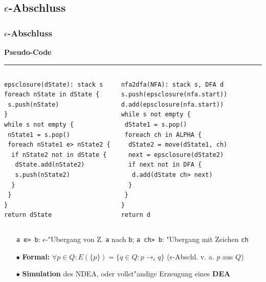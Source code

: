 \documentclass[ignorenonframetext]{beamer}
\begin{document}
\subsection{$\epsilon$-Abschluss}
\begin{frame}[fragile]
    \frametitle{$\epsilon$-Abschluss}
    
        \textbf{Pseudo-Code} 
        \hrule
        \begin{columns}
        \column{4.5cm}
\begin{lstlisting}
epsclosure(dState): stack s
foreach nState in dState {
 s.push(nState)
}
while s not empty { 
 nState1 = s.pop()
 foreach nState1 e> nState2 {
  if nState2 not in dState {
   dState.add(nState2)
   s.push(nState2)
  }
 }
}
return dState
\end{lstlisting}

        \column{4.3cm}
\begin{lstlisting}
nfa2dfa(NFA): stack s, DFA d
s.push(epsclosure(nfa.start))
d.add(epsclosure(nfa.start))
while s not empty {
 dState1 = s.pop()
 foreach ch in ALPHA {
  dState2 = move(dState1, ch)
  next = epsclosure(dState2)
  if next not in DFA {
   d.add(dState ch> next)
  }
 }
}
return d
\end{lstlisting}

        \end{columns}
\begin{itemize}
    \item[]  \footnotesize \texttt{a e> b}: $\epsilon$-"Ubergang von Z. \texttt{a} nach \texttt{b}; \texttt{a ch> b}: "Ubergang mit Zeichen \texttt{ch}
    \item[$\bullet$] \textbf{Formal:} $\forall p \in Q : E(\{p\}) = \{ q \in Q : p \rightarrow_\epsilon q \}$ ($\epsilon$-Abschl. v. a. $p$ aus $Q$)
    \item[$\bullet$] \textbf{Simulation} des NDEA, oder vollst"andige Erzeugung eines \textbf{DEA}
\end{itemize}
\end{frame}
\end{document}

